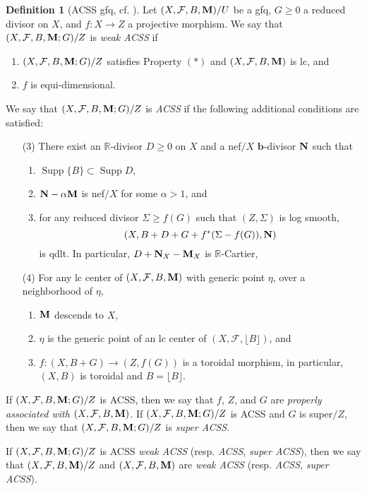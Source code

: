 \documentclass[11pt]{amsart}
\numberwithin{equation}{section}
\newcommand{\bb}{\bm{b}}
\newcommand{\Mm}{{\bf{M}}}
\newcommand{\Nn}{{\bf{N}}}
\newcommand{\Rr}{\mathbb{R}}
\newcommand{\Supp}{\operatorname{Supp}}
\newcommand{\Ff}{\mathcal{F}}
\theoremstyle{definition}
\newtheorem{defn}[thm]{Definition}
\theoremstyle{definition}
\theoremstyle{definition}
\begin{document}
\begin{defn}[ACSS gfq, {cf. \cite[Definition 4.3]{DLM23}}]\label{defn: ACSS f-triple}
Let $(X,\Ff,B,\Mm)/U$ be a gfq, $G\geq 0$ a reduced divisor on $X$, and $f: X\rightarrow Z$ a projective morphism. We say that $(X,\Ff,B,\Mm;G)/Z$ is \emph{weak ACSS} if 
\begin{enumerate}
    \item $(X,\Ff,B,\Mm;G)/Z$ satisfies Property $(*)$ and $(X,\Ff,B,\Mm)$ is lc, and
    \item $f$ is equi-dimensional.
\end{enumerate}
We say that $(X,\Ff,B,\Mm;G)/Z$ is \emph{ACSS} if the following additional conditions are satisfied:
\begin{enumerate}
  \item[(3)]  There exist an $\Rr$-divisor $D\geq 0$ on $X$ and a nef$/X$ $\bb$-divisor $\Nn$ such that
    \begin{enumerate}
      \item  $\Supp\{B\}\subset\Supp D$,
      \item $\Nn-\alpha \Mm$ is nef$/X$ for some $\alpha>1$, and
      \item for any reduced divisor $\Sigma\geq f(G)$ such that $(Z,\Sigma)$ is log smooth, $$(X,B+D+G+f^*(\Sigma-f(G)),\Nn)$$ 
      is qdlt. In particular, $D+\Nn_X-\Mm_X$ is $\Rr$-Cartier, 
    \end{enumerate}
  \item[(4)] For any lc center of $(X,\Ff,B,\Mm)$ with generic point $\eta$, over a neighborhood of $\eta,$
    \begin{enumerate}
      \item $\Mm$ descends to $X$,
      \item $\eta$ is the generic point of an lc center of $(X,\Ff,\lfloor B\rfloor)$, and
       \item $f: (X,B+G)\rightarrow (Z,f(G))$ is a toroidal morphism, in particular, $(X,B)$ is toroidal and $B=\lfloor B\rfloor$.
    \end{enumerate}
\end{enumerate}

If $(X,\Ff,B,\Mm;G)/Z$ is ACSS, then we say that $f$, $Z$, and $G$ are \emph{properly associated with} $(X,\Ff,B,\Mm)$. If $(X,\Ff,B,\Mm;G)/Z$ is ACSS and $G$ is super$/Z$, then we say that $(X,\Ff,B,\Mm;G)/Z$ is \emph{super ACSS}.

If $(X,\Ff,B,\Mm;G)/Z$ is ACSS \emph{weak ACSS} (resp. \emph{ACSS}, \emph{super ACSS}), then we say that $(X,\Ff,B,\Mm)/Z$ and $(X,\Ff,B,\Mm)$ are \emph{weak ACSS} (resp. \emph{ACSS}, \emph{super ACSS}).
\end{defn}
\end{document}
